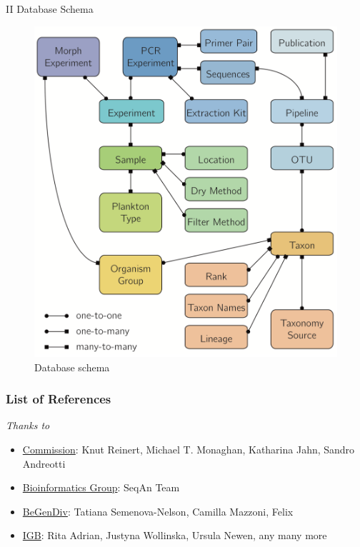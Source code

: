 \documentclass[xcolor=dvipsnames,envcountsect]{beamer}
\begin{document}
\begin{frame}{II Database Schema}
  \begin{figure}\centering
    \includegraphics[scale=.3]{DB_schema}
    \caption{Database schema \cite{PlanktonDB}}
    \end{figure}
\end{frame}


	\begin{frame}[allowframebreaks]
		\justifying
		\frametitle{List of References}
		\printbibliography
	\end{frame}
	\begin{frame}
		\centering
		\begin{block}
			\scshape
				\begin{center}
					\large\emph{Thanks to} %
				\end{center}
				\begin{itemize}
				    \item \underline{Commission}: Knut Reinert, Michael T. Monaghan, Katharina Jahn, Sandro Andreotti
				    \item \underline{Bioinformatics Group}: SeqAn Team
				    \item \underline{BeGenDiv}: Tatiana Semenova-Nelson, Camilla Mazzoni, Felix
				    \item \underline{IGB}: Rita Adrian, Justyna Wollinska, Ursula Newen, any many more
				\end{itemize}
		\end{block}
    \nocite{Burki2020, PriSeT2021}
	\end{frame}
\end{document}

